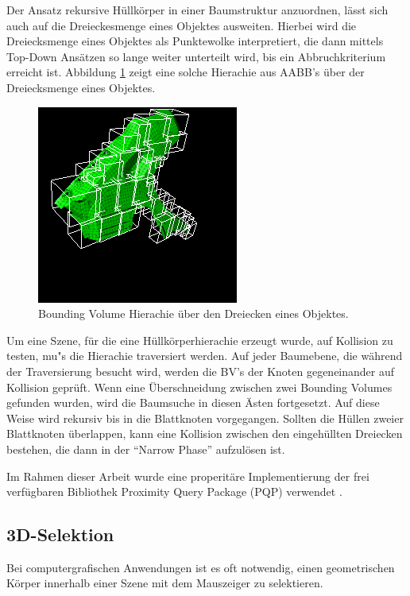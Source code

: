 Der Ansatz rekursive H\"ullk\"orper in einer Baumstruktur anzuordnen, l\"asst
sich auch auf die Dreieckesmenge eines Objektes ausweiten. Hierbei wird die
Dreiecksmenge eines Objektes als Punktewolke interpretiert, die dann mittels
Top-Down Ans\"atzen so lange weiter unterteilt wird, bis ein Abbruchkriterium
erreicht ist. Abbildung \ref{bvho} zeigt eine solche Hierachie aus AABB's \"uber
der Dreiecksmenge eines Objektes.

\begin{figure}[H]
\centerline{
	\includegraphics[scale=0.7]{graphics/BV-Hierarchie5.png}
}
\caption{Bounding Volume Hierachie \"uber den Dreiecken eines Objektes.}
\label{bvho}
\end{figure}

Um eine Szene, f\"ur die eine H\"ullk\"orperhierachie erzeugt wurde, auf Kollision zu testen, mu"s die Hierachie traversiert werden. Auf jeder Baumebene, die w\"ahrend der Traversierung besucht wird,  werden die BV's der Knoten
gegeneinander auf Kollision gepr\"uft. Wenn eine \"Uberschneidung zwischen zwei Bounding Volumes gefunden wurden, wird
die Baumsuche in diesen \"Asten fortgesetzt. Auf diese Weise wird rekursiv bis in die Blattknoten vorgegangen. Sollten die H\"ullen zweier Blattknoten \"uberlappen, kann eine Kollision zwischen den eingeh\"ullten Dreiecken bestehen, die dann in der "`Narrow Phase"' aufzul\"osen ist.

Im Rahmen dieser Arbeit wurde eine properit\"are Implementierung der frei verf\"ugbaren Bibliothek Proximity Query
Package (PQP) verwendet \cite{PQP}.

\subsection{3D-Selektion}
\label{picking}

Bei computergrafischen Anwendungen ist es oft notwendig, einen geometrischen K\"orper innerhalb einer Szene mit dem Mauszeiger zu selektieren. 

